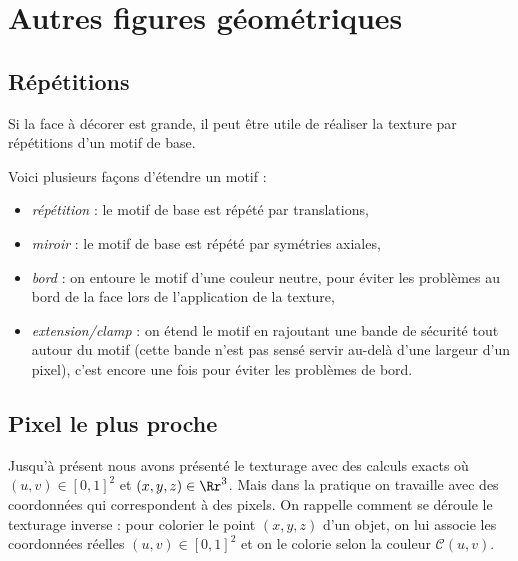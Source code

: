 \documentclass[11pt,class=report,crop=false]{standalone}
\begin{document}
		
\section{Autres figures géométriques}

\subsection{Répétitions}

Si la face à décorer est grande, il peut être utile de réaliser la texture par répétitions d'un motif de base. 


Voici plusieurs façons d'étendre un motif :
\begin{itemize}
	\item \emph{répétition} : le motif de base est répété par translations,
	\item \emph{miroir} : le motif de base est répété par symétries axiales,
	\item \emph{bord} : on entoure le motif d'une couleur neutre, pour éviter les problèmes au bord de la face lors de l'application de la texture,
	\item \emph{extension/\emph{clamp}} : on étend le motif en rajoutant une bande de sécurité tout autour du motif (cette bande n'est pas sensé servir au-delà d'une largeur d'un pixel), c'est encore une fois pour éviter les problèmes de bord.
\end{itemize}


\subsection{Pixel le plus proche}


Jusqu'à présent nous avons présenté le texturage avec des calculs exacts où $(u,v) \in [0,1]^2$ et 
 $(x,y,z) \in \Rr^3$. 
Mais dans la pratique on travaille avec des coordonnées qui correspondent à des pixels.
On rappelle comment se déroule le texturage inverse : pour colorier le point $(x,y,z)$ d'un objet, on lui associe les coordonnées réelles $(u,v) \in [0,1]^2$ et on le colorie selon la couleur $\mathcal{C}(u,v)$. 
\end{document}
